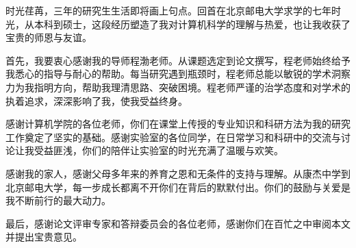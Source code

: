 \begin{acknowledgement}

时光荏苒，三年的研究生生活即将画上句点。回首在北京邮电大学求学的七年时光，从本科到硕士，这段经历塑造了我对计算机科学的理解与热爱，也让我收获了宝贵的师恩与友谊。

首先，我要衷心感谢我的导师程渤老师。从课题选定到论文撰写，程老师始终给予我悉心的指导与耐心的帮助。每当研究遇到瓶颈时，程老师总能以敏锐的学术洞察力为我指明方向，帮助我理清思路、突破困境。程老师严谨的治学态度和对学术的执着追求，深深影响了我，使我受益终身。

感谢计算机学院的各位老师，你们在课堂上传授的专业知识和科研方法为我的研究工作奠定了坚实的基础。感谢实验室的各位同学，在日常学习和科研中的交流与讨论让我受益匪浅，你们的陪伴让实验室的时光充满了温暖与欢笑。

感谢我的家人，感谢父母多年来的养育之恩和无条件的支持与理解。从康杰中学到北京邮电大学，每一步成长都离不开你们在背后的默默付出。你们的鼓励与关爱是我不断前行的最大动力。

最后，感谢论文评审专家和答辩委员会的各位老师，感谢你们在百忙之中审阅本文并提出宝贵意见。

\end{acknowledgement}
